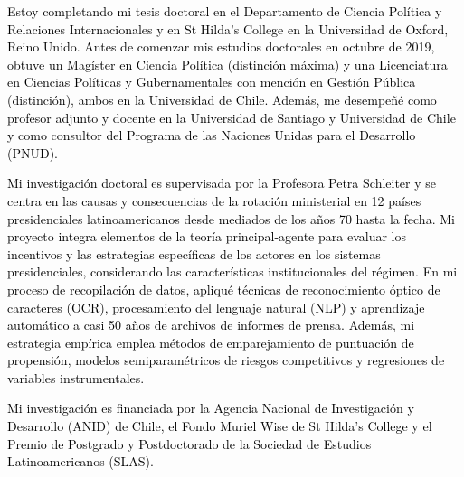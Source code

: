 




\vspace{3mm}

\begin{cvparagraph}

\textcolor{black}{Estoy completando mi tesis doctoral en el Departamento de Ciencia Política y Relaciones Internacionales y en St Hilda’s College en la Universidad de Oxford, Reino Unido.  Antes de comenzar mis estudios doctorales en octubre de 2019, obtuve un Magíster en Ciencia Política (distinción máxima) y una Licenciatura en Ciencias Políticas y Gubernamentales con mención en Gestión Pública (distinción), ambos en la Universidad de Chile. Además, me desempeñé como profesor adjunto y docente en la Universidad de Santiago y Universidad de Chile y como consultor del Programa de las Naciones Unidas para el Desarrollo (PNUD).}

\textcolor{black}{Mi investigación doctoral es supervisada por la Profesora Petra Schleiter y se centra en las causas y consecuencias de la rotación ministerial en 12 países presidenciales latinoamericanos desde mediados de los años 70 hasta la fecha. Mi proyecto integra elementos de la teoría principal-agente para evaluar los incentivos y las estrategias específicas de los actores en los sistemas presidenciales, considerando las características institucionales del régimen. En mi proceso de recopilación de datos, apliqué técnicas de reconocimiento óptico de caracteres (OCR), procesamiento del lenguaje natural (NLP) y aprendizaje automático a casi 50 años de archivos de informes de prensa. Además, mi estrategia empírica emplea métodos de emparejamiento de puntuación de propensión, modelos semiparamétricos de riesgos competitivos y regresiones de variables instrumentales.}

\textcolor{black}{Mi investigación es financiada por la Agencia Nacional de Investigación y Desarrollo (ANID) de Chile, el Fondo Muriel Wise de St Hilda's College y el Premio de Postgrado y Postdoctorado de la Sociedad de Estudios Latinoamericanos (SLAS).}
\vspace{1mm}
\end{cvparagraph}